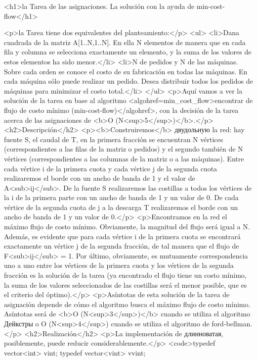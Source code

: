 <h1>la Tarea de las asignaciones. La solución con la ayuda de min-cost-flow</h1>

<p>la Tarea tiene dos equivalentes del planteamiento:</p>
<ul>
<li>Dana cuadrada de la matriz A[1..N,1..N]. En ella N elementos de manera que en cada fila y columna se selecciona exactamente un elemento, y la suma de los valores de estos elementos ha sido menor.</li>
<li>N de pedidos y N de las máquinas. Sobre cada orden se conoce el costo de su fabricación en todas las máquinas. En cada máquina sólo puede realizar un pedido. Desea distribuir todos los pedidos de máquinas para minimizar el costo total.</li>
</ul>
<p>Aquí vamos a ver la solución de la tarea en base al algoritmo <algohref=min_cost_flow>encontrar de flujo de costo mínimo (min-cost-flow)</algohref>, con la decisión de la tarea acerca de las asignaciones de <b>O (N<sup>5</sup>)</b>.</p>
<h2>Descripción</h2>
<p><b>Construiremos</b> двудольную la red: hay fuente S, el caudal de T, en la primera fracción se encuentran N vértices (correspondientes a las filas de la matriz o pedidos) y el segundo también de N vértices (correspondientes a las columnas de la matriz o a las máquinas). Entre cada vértice i de la primera cuota y cada vértice j de la segunda cuota realizaremos el borde con un ancho de banda de 1 y el valor de A<sub>ij</sub>. De la fuente S realizaremos las costillas a todos los vértices de la i de la primera parte con un ancho de banda de 1 y un valor de 0. De cada vértice de la segunda cuota de j a la descarga T realizaremos el borde con un ancho de banda de 1 y un valor de 0.</p>
<p>Encontramos en la red el máximo flujo de costo mínimo. Obviamente, la magnitud del flujo será igual a N. Además, es evidente que para cada vértice i de la primera cuota se encontrará exactamente un vértice j de la segunda fracción, de tal manera que el flujo de F<sub>ij</sub> = 1. Por último, obviamente, es mutuamente correspondencia uno a uno entre los vértices de la primera cuota y los vértices de la segunda fracción es la solución de la tarea (ya encontrado el flujo tiene un costo mínimo, la suma de los valores seleccionados de las costillas será el menor posible, que es el criterio del óptimo).</p>
<p>Asíntotas de esta solución de la tarea de asignación depende de cómo el algoritmo busca el máximo flujo de costo mínimo. Asíntotas será de <b>O (N<sup>3</sup>)</b> cuando se utiliza el algoritmo Дейкстры o O (N<sup>4</sup>) cuando se utiliza el algoritmo de ford-bellman.</p>
<h2>Realización</h2>
<p>La implementación de длинноватая, posiblemente, puede reducir considerablemente.</p>
<code>typedef vector<int> vint;
typedef vector<vint> vvint;

